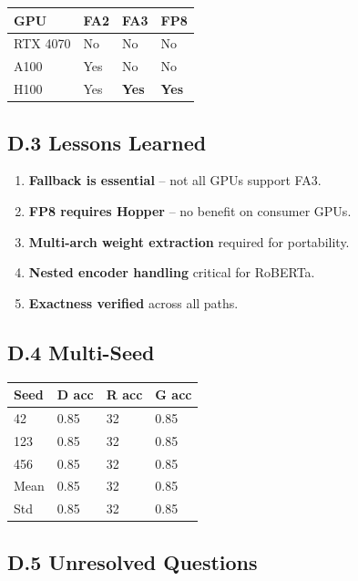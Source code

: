 \begin{table}[H]
\centering
\small
\begin{tabular}{llll}
\toprule
\textbf{GPU} & \textbf{FA2} & \textbf{FA3} & \textbf{FP8} \\
\midrule
RTX 4070 & No & No & No \\
A100 & Yes & No & No \\
H100 & Yes & \textbf{Yes} & \textbf{Yes} \\
\bottomrule
\end{tabular}
\end{table}

\subsection{D.3 Lessons Learned}

\begin{enumerate}
\item \textbf{Fallback is essential} -- not all GPUs support FA3.
\item \textbf{FP8 requires Hopper} -- no benefit on consumer GPUs.
\item \textbf{Multi-arch weight extraction} required for portability.
\item \textbf{Nested encoder handling} critical for RoBERTa.
\item \textbf{Exactness verified} across all paths.

\end{enumerate}
\subsection{D.4 Multi-Seed}

\begin{table}[H]
\centering
\small
\begin{tabular}{llll}
\toprule
\textbf{Seed} & \textbf{D acc} & \textbf{R acc} & \textbf{G acc} \\
\midrule
42 & 0.85 & 32 & 0.85 \\
123 & 0.85 & 32 & 0.85 \\
456 & 0.85 & 32 & 0.85 \\
Mean & 0.85 & 32 & 0.85 \\
Std & 0.85 & 32 & 0.85 \\
\bottomrule
\end{tabular}
\end{table}

\subsection{D.5 Unresolved Questions}

